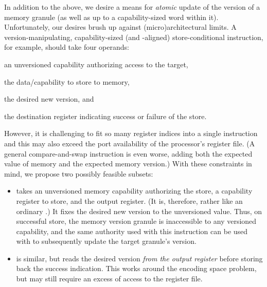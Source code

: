 In addition to the above, we desire a means for \emph{atomic} update of the
version of a memory granule (as well as up to a capability-sized word within
it).  Unfortunately, our desires brush up against (micro)architectural limits.
A version-manipulating, capability-sized (and -aligned) store-conditional
instruction, for example, should take four operands:
%
\begin{inenum}

  \item an unversioned capability authorizing access to the target,

  \item the data/capability to store to memory,

  \item the desired new version, and

  \item the destination register indicating success or failure of the store.

\end{inenum}
%
However, it is challenging to fit so many register indices into a single
instruction and this may also exceed the port availability of the processor's
register file.  (A general compare-and-swap instruction is even worse, adding
both the expected value of memory and the expected memory version.)
%
With these constraints in mind, we propose two possibly feasible subsets:
%
\begin{itemize}

  \item {} takes an unversioned memory
capability authorizing the store, a capability register to store, and the
output register.  (It is, therefore, rather like an ordinary
.)  It fixes the desired new version to the unversioned value.
Thus, on successful store, the memory version granule is inaccessible to any
versioned capability, and the same authority used with this instruction can be
used with  to subsequently update the target
granule's version.

  \item {} is similar, but reads the desired
version \emph{from the output register} before storing back the success
indication.  This works around the encoding space problem, but may still
require an excess of access to the register file.
%

\end{itemize}

